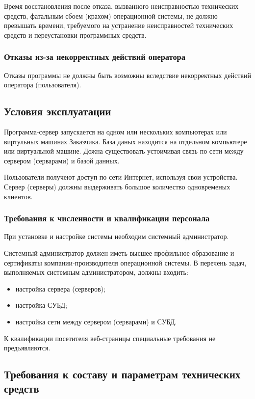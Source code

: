 \documentclass[a4page]{article}
\begin{document}
Время восстановления после отказа, вызванного неисправностью технических средств, фатальным сбоем (крахом) операционной системы, не должно превышать времени, требуемого на устранение неисправностей технических средств и переустановки программных средств.

\subsubsection{Отказы из-за некорректных действий оператора}

Отказы программы не должны быть возможны вследствие некорректных действий оператора (пользователя). 

\subsection{Условия эксплуатации}

Программа-сервер запускается на одном или нескольких компьютерах или виртульных машинах Заказчика. База даных находится на отдельном компьютере или виртуальной машине. Дожна существовать устоичивая связь по сети между сервером (серварами) и базой данных.

Пользователи получеют доступ по сети Интернет, используя свои устройства. Сервер (серверы) должны выдерживать большое количество одновременых клиентов.

\subsubsection{Требования к численности и квалификации персонала}

При установке и настройке системы необходим системный администратор.

Системный администратор должен иметь высшее профильное образование и сертификаты компании-производителя операционной системы. В перечень задач, выполняемых системным администратором, должны входить:

\begin{itemize}
  \item настройка сервера (серверов);
  \item настройка СУБД;
  \item настройка сети между сервером (серварами) и СУБД.
\end{itemize}

К квалификации посетителя веб-страницы специальные требования не предъявляются.

\subsection{Требования к составу и параметрам технических средств}
\end{document}
